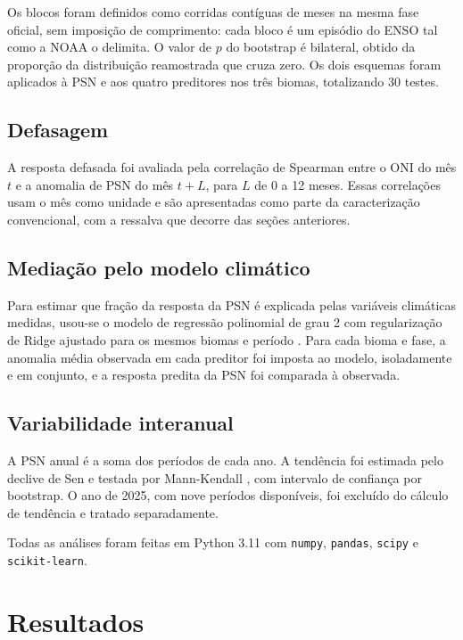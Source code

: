 \documentclass[a4paper,fleqn]{cas-sc}
\begin{document}
Os blocos foram definidos como corridas contíguas de meses na mesma fase oficial, sem imposição de comprimento: cada bloco é um episódio do ENSO tal como a NOAA o delimita. O valor de $p$ do bootstrap é bilateral, obtido da proporção da distribuição reamostrada que cruza zero. Os dois esquemas foram aplicados à PSN e aos quatro preditores nos três biomas, totalizando 30 testes.

\subsection{Defasagem}

A resposta defasada foi avaliada pela correlação de Spearman entre o ONI do mês $t$ e a anomalia de PSN do mês $t+L$, para $L$ de 0 a 12 meses. Essas correlações usam o mês como unidade e são apresentadas como parte da caracterização convencional, com a ressalva que decorre das seções anteriores.

\subsection{Mediação pelo modelo climático}

Para estimar que fração da resposta da PSN é explicada pelas variáveis climáticas medidas, usou-se o modelo de regressão polinomial de grau 2 com regularização de Ridge ajustado para os mesmos biomas e período \citep{oliveira2026, hoerl1970}. Para cada bioma e fase, a anomalia média observada em cada preditor foi imposta ao modelo, isoladamente e em conjunto, e a resposta predita da PSN foi comparada à observada.

\subsection{Variabilidade interanual}

A PSN anual é a soma dos períodos de cada ano. A tendência foi estimada pelo declive de Sen \citep{sen1968} e testada por Mann-Kendall \citep{mann1945}, com intervalo de confiança por bootstrap. O ano de 2025, com nove períodos disponíveis, foi excluído do cálculo de tendência e tratado separadamente.

Todas as análises foram feitas em Python 3.11 com \texttt{numpy}, \texttt{pandas}, \texttt{scipy} e \texttt{scikit-learn}.

\section{Resultados}
\end{document}
